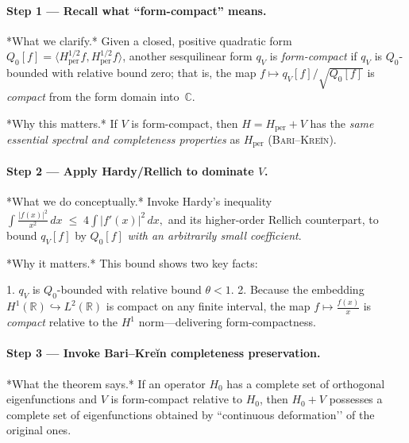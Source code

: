 \documentclass[11pt]{article}
\begin{document}
\vspace{0.6em}
\paragraph{Step 1 — Recall what “form-compact” means.}

*What we clarify.*  
Given a closed, positive quadratic form  
\(Q_0[f]=\langle H_{\mathrm{per}}^{1/2}f, H_{\mathrm{per}}^{1/2}f\rangle\),  
another sesquilinear form \(q_V\) is \emph{form-compact} if  
\(q_V\) is $Q_0$\!-bounded with relative bound zero;  
that is, the map  
\(f\mapsto q_V[f]/\!\sqrt{Q_0[f]}\)  
is \emph{compact} from the form domain into~\(\mathbb C\).

*Why this matters.*  
If \(V\) is form-compact, then \(H=H_{\mathrm{per}}+V\) has the
\emph{same essential spectral and completeness properties} as
\(H_{\mathrm{per}}\) (\textsc{Bari–Kreĭn}).

\vspace{0.4em}
\paragraph{Step 2 — Apply Hardy/Rellich to dominate $V$.}

*What we do conceptually.*  
Invoke Hardy’s inequality  
\(
  \displaystyle
  \int\frac{|f(x)|^{2}}{x^{2}}\,dx
  \;\le\;
  4\int |f'(x)|^{2}\,dx,
\)
and its higher-order Rellich counterpart, to bound \(q_V[f]\) by
\(Q_0[f]\) \emph{with an arbitrarily small coefficient}.

*Why it matters.*  
This bound shows two key facts:

1.  \(q_V\) is $Q_0$-bounded with relative bound \(\theta<1\).  
2.  Because the embedding
    \(H^{1}(\mathbb R)\hookrightarrow L^{2}(\mathbb R)\) is compact on
    any finite interval, the map
    \(f\mapsto \frac{f(x)}{x}\) is \emph{compact} relative to the
    $H^{1}$ norm—delivering form-compactness.

\vspace{0.4em}
\paragraph{Step 3 — Invoke Bari–Kreĭn completeness preservation.}

*What the theorem says.*  
If an operator \(H_0\) has a complete set of orthogonal eigenfunctions
and \(V\) is form-compact relative to \(H_0\), then
\(H_0+V\) possesses a complete set of eigenfunctions obtained by
“continuous deformation’’ of the original ones.
\end{document}
